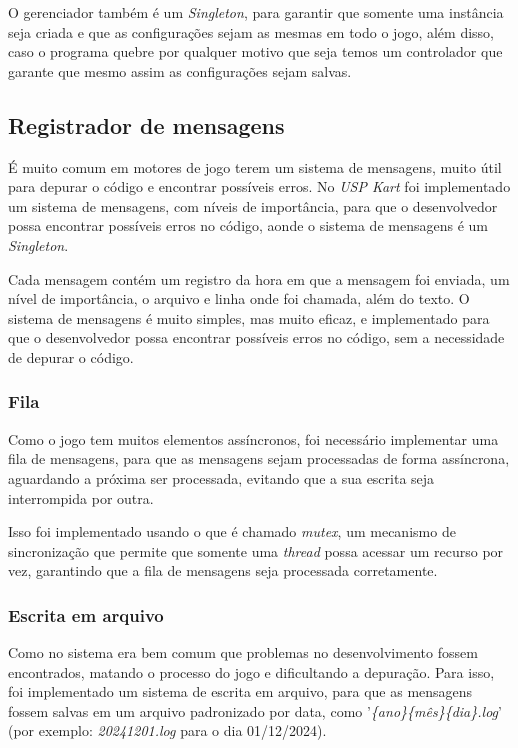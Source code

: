 O gerenciador também é um \textit{Singleton}, para garantir que somente uma instância seja criada e que as configurações sejam as mesmas em todo o jogo, além disso, caso o programa quebre por qualquer motivo que seja temos um controlador que garante que mesmo assim as configurações sejam salvas.

\subsection{Registrador de mensagens}

É muito comum em motores de jogo terem um sistema de mensagens, muito útil para depurar o código e encontrar possíveis erros. No \textit{USP Kart} foi implementado um sistema de mensagens, com níveis de importância, para que o desenvolvedor possa encontrar possíveis erros no código, aonde o sistema de mensagens é um \textit{Singleton}.

Cada mensagem contém um registro da hora em que a mensagem foi enviada, um nível de importância, o arquivo e linha onde foi chamada, além do texto. O sistema de mensagens é muito simples, mas muito eficaz, e implementado para que o desenvolvedor possa encontrar possíveis erros no código, sem a necessidade de depurar o código.

\subsubsection{Fila}

Como o jogo tem muitos elementos assíncronos, foi necessário implementar uma fila de mensagens, para que as mensagens sejam processadas de forma assíncrona, aguardando a próxima ser processada, evitando que a sua escrita seja interrompida por outra.

Isso foi implementado usando o que é chamado \textit{mutex}, um mecanismo de sincronização que permite que somente uma \textit{thread} possa acessar um recurso por vez, garantindo que a fila de mensagens seja processada corretamente.

\subsubsection{Escrita em arquivo}

Como no sistema era bem comum que problemas no desenvolvimento fossem encontrados, matando o processo do jogo e dificultando a depuração. Para isso, foi implementado um sistema de escrita em arquivo, para que as mensagens fossem salvas em um arquivo padronizado por data, como '\textit{\{ano\}\{mês\}\{dia\}.log}' (por exemplo: \textit{20241201.log} para o dia 01/12/2024).

